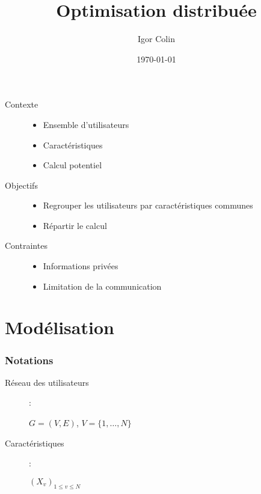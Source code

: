 \documentclass[c]{beamer}
\title{Optimisation distribu\'ee}
\author{Igor Colin}
\date{\today}
\begin{document}
\begin{frame}
    \begin{description}
        \item[Contexte]
            \begin{itemize}
                \item Ensemble d'utilisateurs
                \item Caract\'eristiques
                \item Calcul potentiel
            \end{itemize}
        \item[Objectifs]
            \begin{itemize}
                \item Regrouper les utilisateurs par caract\'eristiques communes
                \item R\'epartir le calcul
            \end{itemize}
        \item[Contraintes]
            \begin{itemize}
                \item Informations priv\'ees
                \item Limitation de la communication
            \end{itemize}
    \end{description}
\end{frame}

\section{Mod\'elisation}
\begin{frame}
    \frametitle{Notations}
    \begin{description}
        \item[R\'eseau des utilisateurs] :
            
            $G = (V, E)$, $V = \{1, \ldots, N\}$
        \item[Caract\'eristiques] :
            
            $\left( X_v \right)_{1 \leq v \leq N}$
    \end{description}
\end{frame}
\end{document}
